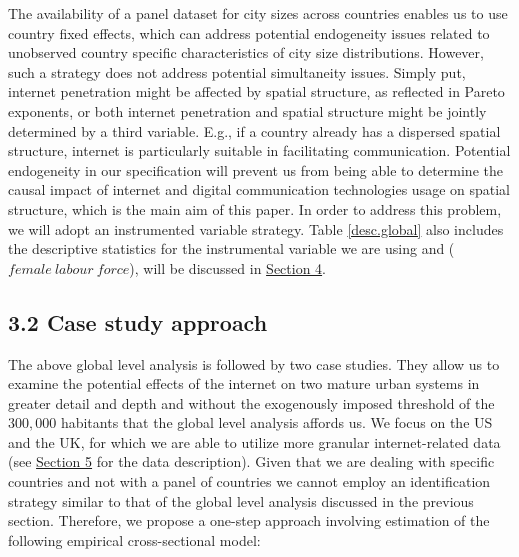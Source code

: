\documentclass[10pt,letterpaper]{article}
\begin{document}
\begin{table}

\caption{\label{tab:unnamed-chunk-4}Correlations between ICT variables\label{cor}}
\end{table}

The availability of a panel dataset for city sizes across countries
enables us to use country fixed effects, which can address potential
endogeneity issues related to unobserved country specific
characteristics of city size distributions. However, such a strategy
does not address potential simultaneity issues. Simply put, internet
penetration might be affected by spatial structure, as reflected in
Pareto exponents, or both internet penetration and spatial structure
might be jointly determined by a third variable. E.g., if a country
already has a dispersed spatial structure, internet is particularly
suitable in facilitating communication. Potential endogeneity in our
specification will prevent us from being able to determine the causal
impact of internet and digital communication technologies usage on
spatial structure, which is the main aim of this paper. In order to
address this problem, we will adopt an instrumented variable strategy.
Table \ref{desc.global} also includes the descriptive statistics for the
instrumental variable we are using and (\(female\:labour\:force\)), will
be discussed in \protect\hyperlink{sec4}{Section 4}.

\hypertarget{sec3.2}{%
\subsection{3.2 Case study approach}\label{sec3.2}}

The above global level analysis is followed by two case studies. They
allow us to examine the potential effects of the internet on two mature
urban systems in greater detail and depth and without the exogenously
imposed threshold of the \(300,000\) habitants that the global level
analysis affords us. We focus on the US and the UK, for which we are
able to utilize more granular internet-related data (see
\protect\hyperlink{sec5}{Section 5} for the data description). Given
that we are dealing with specific countries and not with a panel of
countries we cannot employ an identification strategy similar to that of
the global level analysis discussed in the previous section. Therefore,
we propose a one-step approach involving estimation of the following
empirical cross-sectional model:
\end{document}
